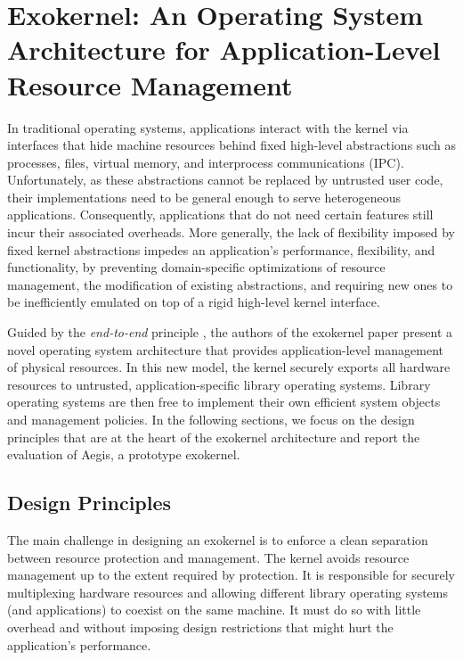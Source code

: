 \section{Exokernel: An Operating System Architecture for Application-Level Resource Management}

In traditional operating systems, applications interact with the kernel via interfaces that hide machine resources behind fixed high-level abstractions such as processes, files, virtual memory, and interprocess communications (IPC).
Unfortunately, as these abstractions cannot be replaced by untrusted user code, their implementations need to be general enough to serve heterogeneous applications.
Consequently, applications that do not need certain features still incur their associated overheads.
More generally, the lack of flexibility imposed by fixed kernel abstractions impedes an application's performance, flexibility, and functionality, by preventing domain-specific optimizations of resource management, the modification of existing abstractions, and requiring new ones to be inefficiently emulated on top of a rigid high-level kernel interface.

Guided by the \emph{end-to-end} principle \cite{DBLP:journals/tocs/SaltzerRC84}, the authors of the exokernel paper \cite{DBLP:conf/sosp/EnglerKO95} present a novel operating system architecture that provides application-level management of physical resources.
In this new model, the kernel securely exports all hardware resources to untrusted, application-specific library operating systems.
Library operating systems are then free to implement their own efficient system objects and management policies.
In the following sections, we focus on the design principles that are at the heart of the exokernel architecture and report the evaluation of Aegis, a prototype exokernel.

\subsection{Design Principles}
The main challenge in designing an exokernel is to enforce a clean separation between resource protection and management.
The kernel avoids resource management up to the extent required by protection.
It is responsible for securely multiplexing hardware resources and allowing different library operating systems (and applications) to coexist on the same machine.
It must do so with little overhead and without imposing design restrictions that might hurt the application's performance.

